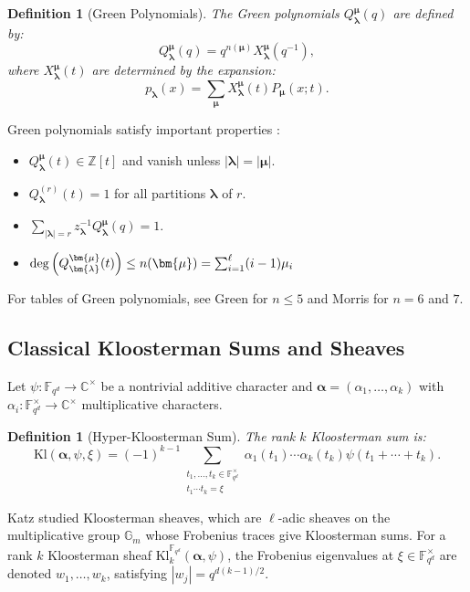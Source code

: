 \documentclass[11pt]{article}
\newtheorem{definition}[theorem]{Definition}
\newcommand{\Fqd}{\mathbb{F}_{q^d}}
\newcommand{\Kl}{\mathrm{Kl}}
\begin{document}
\begin{definition}[Green Polynomials]
The Green polynomials $Q_{\bm{\lambda}}^{\bm{\mu}}(q)$ are defined by:
\[
Q_{\bm{\lambda}}^{\bm{\mu}}(q) = q^{n(\bm{\mu})} X_{\bm{\lambda}}^{\bm{\mu}}(q^{-1}),
\]
where $X_{\bm{\lambda}}^{\bm{\mu}}(t)$ are determined by the expansion:
\[
p_{\bm{\lambda}}(x) = \sum_{\bm{\mu}} X_{\bm{\lambda}}^{\bm{\mu}}(t) P_{\bm{\mu}}(x; t).
\]
\end{definition}

Green polynomials satisfy important properties \cite{green1955characters}:
\begin{itemize}
\item $Q_{\bm{\lambda}}^{\bm{\mu}}(t) \in \mathbb{Z}[t]$ and vanish unless $|\bm{\lambda}| = |\bm{\mu}|$.
\item $Q_{\bm{\lambda}}^{(r)}(t) = 1$ for all partitions $\bm{\lambda}$ of $r$.
\item $\sum_{|\bm{\lambda}|=r} z_{\bm{\lambda}}^{-1} Q_{\bm{\lambda}}^{\bm{\mu}}(q) = 1$.
\item ${\rm deg}\left(Q_{\bm{\lambda}}^{\bm{\mu}}(t)\right)\leq n(\bm{\mu})=\sum_{i=1}^{\ell}(i-1)\mu_i$ 
\end{itemize}
For tables of Green polynomials, see Green \cite{green1955characters} for $n\leq 5$ and Morris \cite{morris1963characters} for $n=6$ and $7$.

\subsection{Classical Kloosterman Sums and Sheaves}

Let $\psi: \Fqd \to \mathbb{C}^\times$ be a nontrivial additive character and $\bm{\alpha} = (\alpha_1, \ldots, \alpha_k)$ with $\alpha_i: \Fqd^\times \to \mathbb{C}^\times$ multiplicative characters.
\medskip

\begin{definition}[Hyper-Kloosterman Sum]
The rank $k$ Kloosterman sum is:
\[
\Kl(\bm{\alpha}, \psi, \xi) = (-1)^{k-1} \sum_{\substack{t_1, \ldots, t_k \in \Fqd^\times \\ t_1 \cdots t_k = \xi}} \alpha_1(t_1) \cdots \alpha_k(t_k) \psi(t_1 + \cdots + t_k).
\]
\end{definition}

Katz \cite{Katz88} studied Kloosterman sheaves, which are $\ell$-adic sheaves on the multiplicative group $\mathbb{G}_m$ whose Frobenius traces give Kloosterman sums. For a rank $k$ Kloosterman sheaf $\Kl_k^{\Fqd}(\bm{\alpha},\psi)$, the Frobenius eigenvalues at $\xi \in \Fqd^\times$ are denoted $w_1, \ldots, w_k$, satisfying $|w_j| = q^{d(k-1)/2}$.
\end{document}
